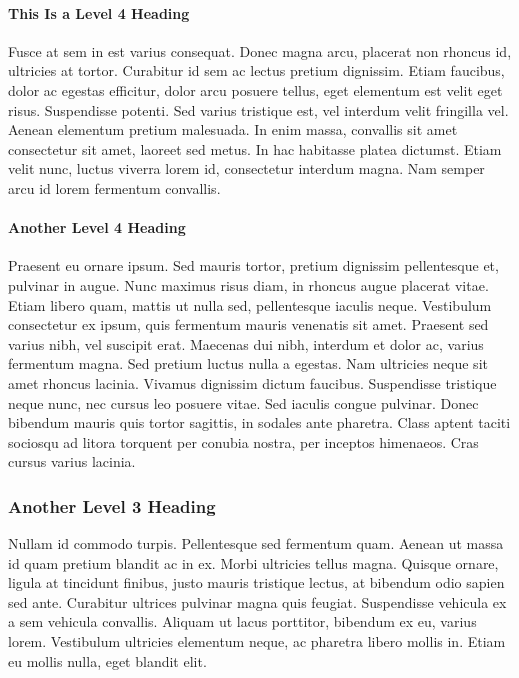 \paragraph{This Is a Level 4 Heading}

Fusce at sem in est varius consequat. Donec magna arcu, placerat non rhoncus id, ultricies at tortor. Curabitur id sem ac lectus pretium dignissim. Etiam faucibus, dolor ac egestas efficitur, dolor arcu posuere tellus, eget elementum est velit eget risus. Suspendisse potenti. Sed varius tristique est, vel interdum velit fringilla vel. Aenean elementum pretium malesuada. In enim massa, convallis sit amet consectetur sit amet, laoreet sed metus. In hac habitasse platea dictumst. Etiam velit nunc, luctus viverra lorem id, consectetur interdum magna. Nam semper arcu id lorem fermentum convallis.

\paragraph{Another Level 4 Heading}

Praesent eu ornare ipsum. Sed mauris tortor, pretium dignissim pellentesque et, pulvinar in augue. Nunc maximus risus diam, in rhoncus augue placerat vitae. Etiam libero quam, mattis ut nulla sed, pellentesque iaculis neque. Vestibulum consectetur ex ipsum, quis fermentum mauris venenatis sit amet. Praesent sed varius nibh, vel suscipit erat. Maecenas dui nibh, interdum et dolor ac, varius fermentum magna. Sed pretium luctus nulla a egestas. Nam ultricies neque sit amet rhoncus lacinia. Vivamus dignissim dictum faucibus. Suspendisse tristique neque nunc, nec cursus leo posuere vitae. Sed iaculis congue pulvinar. Donec bibendum mauris quis tortor sagittis, in sodales ante pharetra. Class aptent taciti sociosqu ad litora torquent per conubia nostra, per inceptos himenaeos. Cras cursus varius lacinia.

\subsubsection{Another Level 3 Heading}

Nullam id commodo turpis. Pellentesque sed fermentum quam. Aenean ut massa id quam pretium blandit ac in ex. Morbi ultricies tellus magna. Quisque ornare, ligula at tincidunt finibus, justo mauris tristique lectus, at bibendum odio sapien sed ante. Curabitur ultrices pulvinar magna quis feugiat. Suspendisse vehicula ex a sem vehicula convallis. Aliquam ut lacus porttitor, bibendum ex eu, varius lorem. Vestibulum ultricies elementum neque, ac pharetra libero mollis in. Etiam eu mollis nulla, eget blandit elit.

